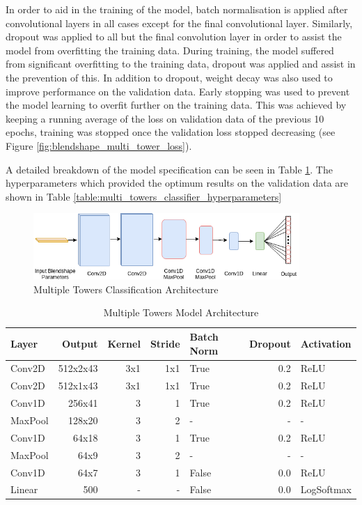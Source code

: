 In order to aid in the training of the model, batch normalisation is applied after convolutional layers in all cases except for the final convolutional layer.
Similarly, dropout was applied to all but the final convolution layer in order to assist the model from overfitting the training data.
During training, the model suffered from significant overfitting to the training data, dropout was applied and assist in the prevention of this.
In addition to dropout, weight decay was also used to improve performance on the validation data.
Early stopping was used to prevent the model learning to overfit further on the training data.
This was achieved by keeping a running average of the loss on validation data of the previous 10 epochs, training was stopped once the validation loss stopped decreasing (see Figure \ref{fig:blendshape_multi_tower_loss}).

A detailed breakdown of the model specification can be seen in Table \ref{table:multi_towers_classifier}.
The hyperparameters which provided the optimum results on the validation data are shown in Table \ref{table:multi_towers_classifier_hyperparameters} 

\begin{figure}[h!]
    \centering
        \includegraphics[width=0.9\textwidth]{figures/classification/blendshape_multi_tower_arch.png}
    \caption{Multiple Towers Classification Architecture}\label{fig:Blendshape_Multiple_Towers}
\end{figure}
\quad

\begin{table}[h!]
\centering
    \begin{tabular}{l | r | r | r | l | r | l}
    \textbf{Layer} & \textbf{Output} & \textbf{Kernel} & \textbf{Stride} & \textbf{Batch Norm} & \textbf{Dropout} & \textbf{Activation} \\ \hline
    Conv2D & 512x2x43 & 3x1 & 1x1 & True & 0.2 & ReLU \\ \hline
    Conv2D & 512x1x43 & 3x1 & 1x1 & True & 0.2 & ReLU \\ \hline
    Conv1D & 256x41 & 3 & 1 & True & 0.2 & ReLU \\ \hline
    MaxPool & 128x20 & 3 & 2 & - & - & - \\ \hline
    Conv1D & 64x18 & 3 & 1 & True & 0.2 & ReLU \\ \hline
    MaxPool & 64x9 & 3 & 2 & - & - & - \\ \hline
    Conv1D & 64x7 & 3 & 1 & False & 0.0 & ReLU \\ \hline
    Linear & 500 & - & - & False & 0.0 & LogSoftmax \\
    \end{tabular} 
    \caption{Multiple Towers Model Architecture}\label{table:multi_towers_classifier}
\end{table}
\quad

